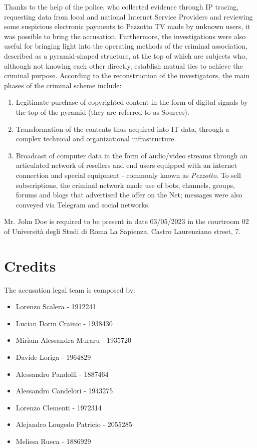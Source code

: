 \documentclass{article}
\begin{document}
\hfill \break
Thanks to the help of the police, who collected evidence through IP tracing, requesting data 
from local and national Internet Service Providers and reviewing some suspicious electronic 
payments to Pezzotto TV made by unknown users, it was possible to bring the accusation. 
Furthermore, the investigations were also useful for bringing light into the operating 
methods of the criminal association, described as a pyramid-shaped structure, at the 
top of which are subjects who, although not knowing each other directly, establish mutual 
ties to achieve the criminal purpose. According to the reconstruction of the investigators, 
the main phases of the criminal scheme include:
\begin{enumerate}
  \item Legitimate purchase of copyrighted content in the form of digital signals by the top of the
        pyramid (they are referred to as Sources).
  \item Transformation of the contents thus acquired into IT data, through a complex technical 
        and organizational infrastructure.
  \item Broadcast of computer data in the form of audio/video streams through an articulated 
        network of resellers and end users equipped with an internet connection and special 
        equipment - commonly known as \textit{Pezzotto}. To sell subscriptions, the criminal 
        network made use of bots, channels, groups, forums and blogs that
        advertised the offer on the Net; messages were also conveyed via Telegram and social networks.
\end{enumerate}

\hfill \break
Mr. John Doe is required to be present in date 03/05/2023 in the courtroom 02 of Università degli Studi di Roma La Sapienza, Castro Laurenziano street, 7.

\section*{Credits}
  The accusation legal team is composed by:
  \begin{itemize}
    \item Lorenzo Scalera - 1912241
    \item Lucian Dorin Crainic - 1938430 
    \item Miriam Alessandra Muraru - 1935720
    \item Davide Loriga - 1964829
    \item Alessandro Pandolfi - 1887464
    \item Alessandro Candelori - 1943275
    \item Lorenzo Clementi - 1972314
    \item Alejandro Lougedo Patricio - 2055285
    \item Melissa Rueca - 1886929
  \end{itemize}
\end{document}
